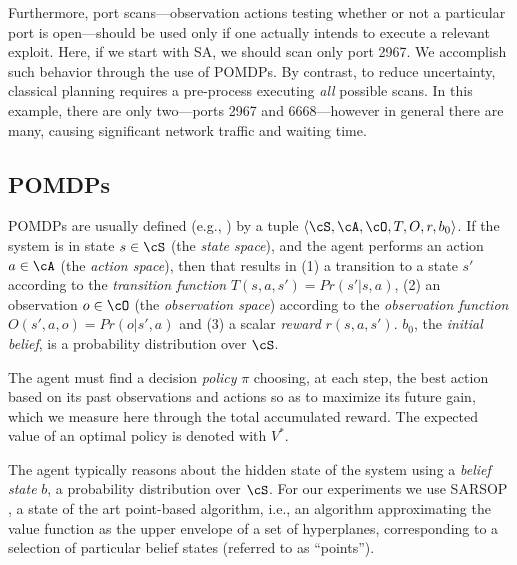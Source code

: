 Furthermore, port scans---observation actions testing whether or not a
particular port is open---should be used only if one actually intends
to execute a relevant exploit. Here, if we start with SA, we should
scan only port 2967. We accomplish such behavior through the use of
POMDPs. By contrast, to reduce uncertainty, classical planning
requires a pre-process executing \emph{all} possible scans. In this
example, there are only two---ports 2967 and 6668---however in general
there are many, causing significant network traffic and waiting time.





\subsection{POMDPs}


POMDPs are usually defined (e.g., \cite{Monahan82,KaeLitCas-aij98}) by
a tuple $\langle \cS, \cA, \cO, T, O, r, b_0 \rangle$. If the system
is in state $s \in \cS$ (the {\em state space}), and the agent
performs an action $a\in \cA$ (the {\em action space}), then that
results in (1) a transition to a state $s'$ according to the {\em
  transition function} $T(s,a,s')=Pr(s'| s,a)$, (2) an observation
$o\in\cO$ (the {\em observation space}) according to the {\em
  observation function} $O(s',a,o)=Pr(o| s',a)$ and (3) a scalar {\em
  reward} $r(s,a,s')$. $b_0$, the {\em initial belief}, is a
probability distribution over $\cS$. %

The agent must find a decision {\em policy} $\pi$ choosing, at each
step, the best action based on its past observations and actions so as
to maximize its future gain, which we measure here through the total
accumulated reward. The expected value of an optimal policy is denoted
with $V^*$.


The agent typically reasons about the hidden state of the system using
a {\em belief state} $b$, a probability distribution over $\cS$. For
our experiments we use SARSOP \cite{KurHsuLee08}, a state of the art
point-based algorithm, i.e., an algorithm approximating the value
function as the upper envelope of a set of hyperplanes, corresponding
to a selection of particular belief states (referred to as
``points'').




